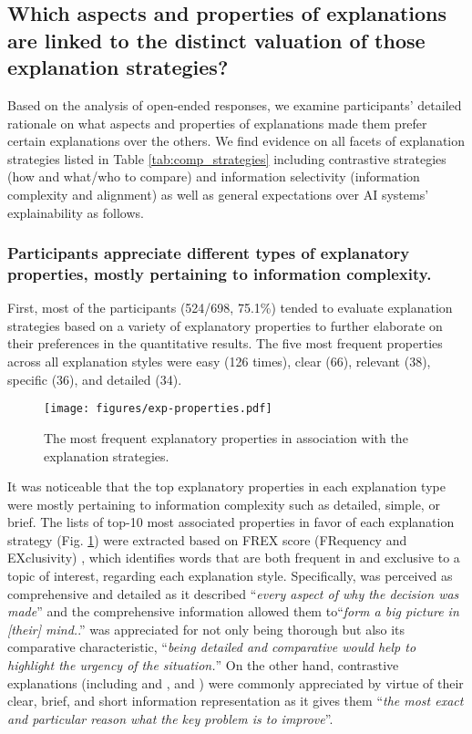 \subsection{Which aspects and properties of explanations are linked to the distinct valuation of those explanation strategies?}
Based on the analysis of open-ended responses, we examine participants' detailed rationale on what aspects and properties of explanations made them prefer certain explanations over the others. We find evidence on all facets of explanation strategies listed in Table \ref{tab:comp_strategies} including contrastive strategies (how and what/who to compare) and information selectivity (information complexity and alignment) as well as general expectations over AI systems' explainability as follows. 

\subsubsection{Participants appreciate different types of explanatory properties, mostly pertaining to information complexity.}
\label{sec:exp-properties}
First, most of the participants (524/698, 75.1\%) tended to evaluate explanation strategies based on a variety of explanatory properties to further elaborate on their preferences in the quantitative results. The five most frequent properties across all explanation styles were easy (126 times), clear (66), relevant (38), specific (36), and detailed (34). 

\begin{figure}[H]%
\centering
\texttt{[image: figures/exp-properties.pdf]}
\caption{The most frequent explanatory properties in association with the explanation strategies.}
\label{fig:exp-properties}
\end{figure}

It was noticeable that the top explanatory properties in each explanation type were mostly pertaining to information complexity such as detailed, simple, or brief. The lists of top-10 most associated properties in favor of each explanation strategy (Fig. \ref{fig:exp-properties}) were extracted based on FREX score (FRequency and EXclusivity) \cite{bischof2012summarizingfrex}, which identifies words that are both frequent in and exclusive to a topic of interest, regarding each explanation style. Specifically, \comp was perceived as comprehensive and detailed as it described ``\textit{every aspect of why the decision was made}'' and the comprehensive information allowed them to``\textit{form a big picture in [their] mind.}.'' \cbho was appreciated for not only being thorough but also its comparative characteristic, ``\textit{being detailed and comparative would help to highlight the urgency of the situation.}'' On the other hand, contrastive explanations (including \cto and \ctt, and \cf) were commonly appreciated by virtue of their clear, brief, and short information representation as it gives them ``\textit{the most exact and particular reason what the key problem is to improve}''.

